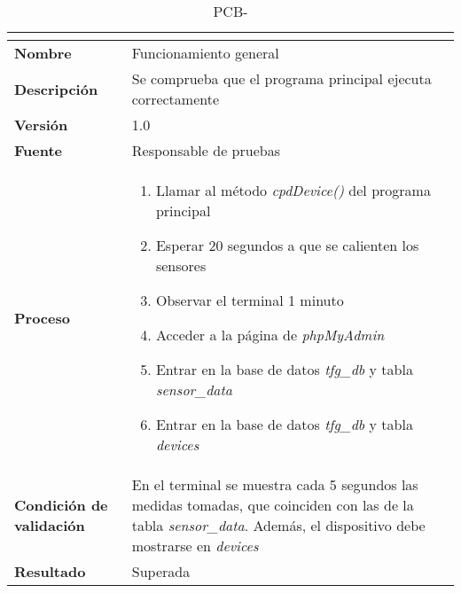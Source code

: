 \begin{table}[H]
	\caption{PCB-\number\pcb}
	\begin{tabular}{|l|p{}|}
		\hline
		\multicolumn{2}{|c|}{\cellcolor[HTML]{BFBFBF}{\color[HTML]{000000} \textbf{PCB-\number\pcb}}} \\ \hline
		\textbf{Nombre}                  & Funcionamiento general                                                                                                                                                            \\ \hline
		\textbf{Descripción}             & Se comprueba que el programa principal ejecuta correctamente                                                                                                                      \\ \hline
		\textbf{Versión}                 & 1.0                                                                                                                                                                               \\ \hline
		\textbf{Fuente}                  & Responsable de pruebas                                                                                                                                                            \\ \hline
		\textbf{Proceso}                 & \begin{enumerate}
			\item Llamar al método \textit{cpdDevice()} del programa principal
			\item Esperar 20 segundos a que se calienten los sensores
			\item Observar el terminal 1 minuto
			\item Acceder a la página de \textit{phpMyAdmin}
			\item Entrar en la base de datos \textit{tfg\_db} y tabla \textit{sensor\_data}
			\item Entrar en la base de datos \textit{tfg\_db} y tabla \textit{devices}
		\end{enumerate}                                                                                                                                                        \\ \hline
		\textbf{Condición de validación} & En el terminal se muestra cada 5 segundos las medidas tomadas, que coinciden con las de la tabla \textit{sensor\_data}. Además, el dispositivo debe mostrarse en \textit{devices} \\ \hline
		\textbf{Resultado}               & Superada                                                                                                                                                                          \\ \hline
	\end{tabular}
\end{table}
\pagebreak

